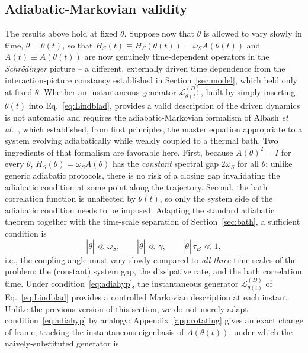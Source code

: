 \documentclass[aps,pra,reprint,superscriptaddress,nofootinbib,longbibliography]{revtex4-2}
\begin{document}
\subsection{Adiabatic-Markovian validity}
\label{sec:adiabatic}

The results above hold at fixed $\theta$. Suppose now that $\theta$ is
allowed to vary slowly in time, $\theta=\theta(t)$, so that
$H_S(t)\equiv H_S(\theta(t))=\omega_S A(\theta(t))$ and
$A(t)\equiv A(\theta(t))$ are now genuinely time-dependent operators
in the \emph{Schr\"odinger} picture -- a different, externally driven
time dependence from the interaction-picture constancy established in
Section~\ref{sec:model}, which held only at fixed $\theta$. Whether an
instantaneous generator $\mathcal L^{(D)}_{\theta(t)}$, built by simply
inserting $\theta(t)$ into Eq.~\eqref{eq:Lindblad}, provides a valid
description of the driven dynamics is not automatic and requires the
adiabatic-Markovian formalism of Albash \emph{et
al.}~\cite{albash2012adiabatic}, which established, from first
principles, the master equation appropriate to a system evolving
adiabatically while weakly coupled to a thermal bath. Two ingredients
of that formalism are favorable here. First, because $A(\theta)^2=I$
for every $\theta$, $H_S(\theta)=\omega_S A(\theta)$ has the
\emph{constant} spectral gap $2\omega_S$ for all $\theta$: unlike
generic adiabatic protocols, there is no risk of a closing gap
invalidating the adiabatic condition at some point along the
trajectory. Second, the bath correlation function is unaffected by
$\theta(t)$, so only the system side of the adiabatic condition needs
to be imposed. Adapting the standard adiabatic theorem together with
the time-scale separation of Section~\ref{sec:bath}, a sufficient
condition is
\begin{equation}
|\dot\theta| \ll \omega_S, \qquad
|\dot\theta| \ll \gamma, \qquad
|\dot\theta|\,\tau_B \ll 1,
\label{eq:adiahyp}
\end{equation}
i.e., the coupling angle must vary slowly compared to \emph{all three}
time scales of the problem: the (constant) system gap, the dissipative
rate, and the bath correlation time. Under
condition~\eqref{eq:adiahyp}, the instantaneous generator
$\mathcal L^{(D)}_{\theta(t)}$ of Eq.~\eqref{eq:Lindblad} provides a
controlled Markovian description at each instant. Unlike the previous
version of this section, we do not merely adapt
condition~\eqref{eq:adiahyp} by analogy: Appendix~\ref{app:rotating}
gives an exact change of frame, tracking the instantaneous eigenbasis
of $A(\theta(t))$, under which the naively-substituted generator is
\end{document}
